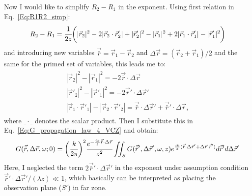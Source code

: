     Now I would like to simplify $R_2 - R_1$ in the exponent. Using first relation in Eq.~\ref{Eq:R1R2_simp}:
    \begin{align}
        R_2 - R_1 = \cfrac{1}{2z} \bigg(|\vec{r}_{2}|^2 - 2|\vec{r}_{2} \cdot \vec{r}'_{2}| + |\vec{r}'_{2}|^2 - |\vec{r}_{1}|^2 + 2|\vec{r}_{1} \cdot \vec{r}'_{1}| - |\vec{r}'_{1}|^2\bigg)
    \end{align} 
    and introducing new variables $\vec{\bar{r}} = \vec{r}_1 - \vec{r}_2$ and $\Delta\vec{r} = (\vec{r}_2 + \vec{r}_1)/2$ and the same for the primed set of variables, this leads me to: 
    \begin{align}
        \begin{array}{c}
        |\vec{r}_{2}|^2 - |\vec{r}_{1}|^2 = -2\vec{\bar{r}}\cdot\Delta\vec{r} \\
        |\vec{r}'_{2}|^2 - |\vec{r}'_{1}|^2 = -2\vec{\bar{r}}'\cdot\Delta\vec{r}' \\
        |\vec{r}_{1} \cdot \vec{r}'_{1}| - |\vec{r}_{2} \cdot \vec{r}'_{2}| = \vec{\bar{r}}\cdot\Delta\vec{r}' + \vec{\bar{r}}'\cdot\Delta\vec{r},
        \end{array}
    \end{align}
    where $\_ \cdot \_$ denotes the scalar product. Then I substitute this in Eq.~\ref{Eq:G_propagation_law_4_VCZ} and obtain:
    \begin{align}
        G(\vec{\bar{r}}, \Delta\vec{r}, \omega; 0) = \bigg(\cfrac{k}{ 2 \pi} \bigg)^2 \cfrac{e^{-\frac{i k}{z} \vec{\bar{r}}\cdot\Delta\vec{r}}}{z^2}     \iint_{\mathcal{S}} G(\vec{\bar{r}}', \Delta\vec{r}', \omega, z) e^{\frac{i k}{z} (\vec{\bar{r}}\cdot\Delta\vec{r}' + \Delta\vec{r}\cdot\vec{\bar{r}}')} d\vec{\bar{r}}' d\Delta\vec{r}' 
        \label{Eq:VCZ_general_form}
    \end{align}
    Here, I neglected the term $2\vec{\bar{r}}'\cdot\Delta\vec{r}'$ in the exponent under assumption condition $\vec{\bar{r}}'\cdot\Delta\vec{r}'/ (\lambda z) \ll 1$, which basically can be interpreted as placing the observation plane ($S'$) in far zone.
    
